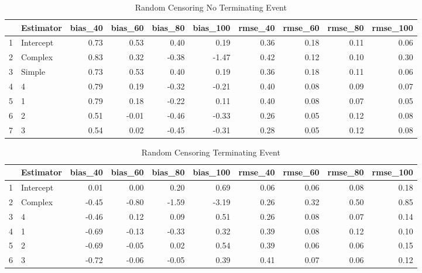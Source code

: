 \begin{table}[ht]
\centering
\begin{tabular}{rlrrrrrrrr}
  \hline
 & Estimator & bias\_40 & bias\_60 & bias\_80 & bias\_100 & rmse\_40 & rmse\_60 & rmse\_80 & rmse\_100 \\ 
  \hline
1 & Intercept & 0.73 & 0.53 & 0.40 & 0.19 & 0.36 & 0.18 & 0.11 & 0.06 \\ 
  2 & Complex & 0.83 & 0.32 & -0.38 & -1.47 & 0.42 & 0.12 & 0.10 & 0.30 \\ 
  3 & Simple & 0.73 & 0.53 & 0.40 & 0.19 & 0.36 & 0.18 & 0.11 & 0.06 \\ 
  4 & 4 & 0.79 & 0.19 & -0.32 & -0.21 & 0.40 & 0.08 & 0.09 & 0.07 \\ 
  5 & 1 & 0.79 & 0.18 & -0.22 & 0.11 & 0.40 & 0.08 & 0.07 & 0.05 \\ 
  6 & 2 & 0.51 & -0.01 & -0.46 & -0.33 & 0.26 & 0.05 & 0.12 & 0.08 \\ 
  7 & 3 & 0.54 & 0.02 & -0.45 & -0.31 & 0.28 & 0.05 & 0.12 & 0.08 \\ 
   \hline
\end{tabular}
\caption{Random Censoring 
 No Terminating Event} 
\end{table}
\begin{table}[ht]
\centering
\begin{tabular}{rlrrrrrrrr}
  \hline
 & Estimator & bias\_40 & bias\_60 & bias\_80 & bias\_100 & rmse\_40 & rmse\_60 & rmse\_80 & rmse\_100 \\ 
  \hline
1 & Intercept & 0.01 & 0.00 & 0.20 & 0.69 & 0.06 & 0.06 & 0.08 & 0.18 \\ 
  2 & Complex & -0.45 & -0.80 & -1.59 & -3.19 & 0.26 & 0.32 & 0.50 & 0.85 \\ 
  3 & 4 & -0.46 & 0.12 & 0.09 & 0.51 & 0.26 & 0.08 & 0.07 & 0.14 \\ 
  4 & 1 & -0.69 & -0.13 & -0.33 & 0.32 & 0.39 & 0.08 & 0.12 & 0.10 \\ 
  5 & 2 & -0.69 & -0.05 & 0.02 & 0.54 & 0.39 & 0.06 & 0.06 & 0.15 \\ 
  6 & 3 & -0.72 & -0.06 & -0.05 & 0.39 & 0.41 & 0.07 & 0.06 & 0.12 \\ 
   \hline
\end{tabular}
\caption{Random Censoring 
 Terminating Event} 
\end{table}
